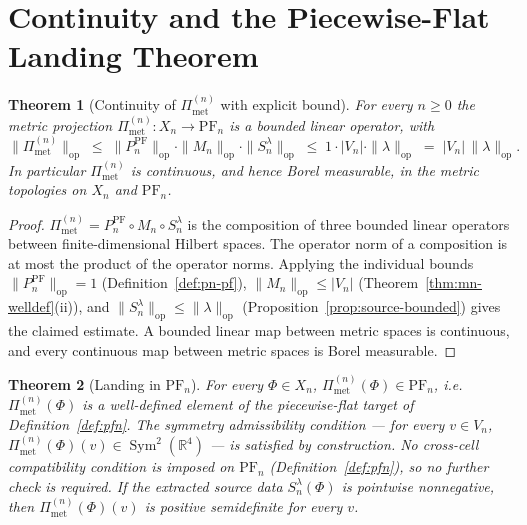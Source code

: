 \documentclass[11pt, a4paper]{amsart}
\newtheorem{theorem}{Theorem}[section]
\theoremstyle{definition}
\newcommand{\R}{\mathbb{R}}
\newcommand{\op}{\operatorname{op}}
\newcommand{\Sym}{\operatorname{Sym}}
\newcommand{\Met}{\mathrm{met}}
\newcommand{\PF}{\mathrm{PF}}
\newcommand{\Pimet}{\Pi_{\Met}}
\begin{document}
\section{Continuity and the Piecewise-Flat Landing Theorem}
\label{sec:continuity}

\begin{theorem}[Continuity of $\Pimet^{(n)}$ with explicit bound]
\label{thm:pimet-continuity}
For every $n \geq 0$ the metric projection $\Pimet^{(n)}
\colon X_n \to \PF_n$ is a bounded linear operator, with
\[
  \|\Pimet^{(n)}\|_\op
    \;\leq\; \|P_n^\PF\|_\op \cdot \|M_n\|_\op
       \cdot \|S_n^\lambda\|_\op
    \;\leq\; 1 \cdot |V_n| \cdot \|\lambda\|_\op
    \;=\; |V_n|\,\|\lambda\|_\op.
\]
In particular $\Pimet^{(n)}$ is continuous, and hence Borel
measurable, in the metric topologies on $X_n$ and $\PF_n$.
\end{theorem}

\begin{proof}
$\Pimet^{(n)} = P_n^\PF \circ M_n \circ S_n^\lambda$ is the composition
of three bounded linear operators between finite-dimensional
Hilbert spaces. The operator norm of a composition is at most
the product of the operator norms. Applying the individual
bounds $\|P_n^\PF\|_\op = 1$ (Definition~\ref{def:pn-pf}),
$\|M_n\|_\op \leq |V_n|$ (Theorem~\ref{thm:mn-welldef}(ii)), and
$\|S_n^\lambda\|_\op \leq \|\lambda\|_\op$
(Proposition~\ref{prop:source-bounded}) gives the claimed
estimate. A bounded linear map between metric spaces is
continuous, and every continuous map between metric spaces is
Borel measurable.
\end{proof}

\begin{theorem}[Landing in $\PF_n$]
\label{thm:pimet-landing}
For every $\Phi \in X_n$, $\Pimet^{(n)}(\Phi) \in \PF_n$, i.e.\
$\Pimet^{(n)}(\Phi)$ is a well-defined element of the
piecewise-flat target of Definition~\ref{def:pfn}. The
symmetry admissibility condition --- for every $v \in V_n$,
$\Pimet^{(n)}(\Phi)(v) \in \Sym^2(\R^4)$ --- is satisfied by
construction. No cross-cell compatibility condition is imposed
on $\PF_n$ (Definition~\ref{def:pfn}), so no further check is
required. If the extracted source data $S_n^\lambda(\Phi)$ is
pointwise nonnegative, then $\Pimet^{(n)}(\Phi)(v)$ is positive
semidefinite for every $v$.
\end{theorem}
\end{document}
